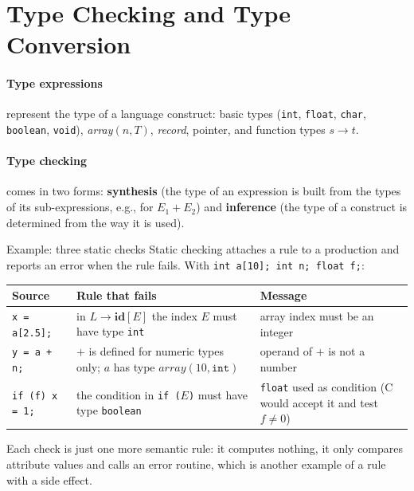 \documentclass[11pt,a4paper]{article}
\begin{document}
\section{Type Checking and Type Conversion}

\paragraph{Type expressions} represent the type of a language construct: basic types (\texttt{int}, \texttt{float}, \texttt{char}, \texttt{boolean}, \texttt{void}), \textit{array}$(n, T)$, \textit{record}, pointer, and function types $s \to t$.

\paragraph{Type checking} comes in two forms: \textbf{synthesis} (the type of an expression is built from the types of its sub-expressions, e.g., for $E_1 + E_2$) and \textbf{inference} (the type of a construct is determined from the way it is used).

\begin{examplebox}{Example: three static checks}
Static checking attaches a rule to a production and reports an error when the rule fails. With \texttt{int a[10]; int n; float f;}:
\begin{center}
\small
\begin{tabular}{@{}l L{5.6cm} L{4.6cm}@{}}
\toprule
\textbf{Source} & \textbf{Rule that fails} & \textbf{Message} \\ \midrule
\texttt{x = a[2.5];} & in $L\to\mathbf{id}[E]$ the index $E$ must have type \texttt{int} & array index must be an integer \\
\texttt{y = a + n;} & $+$ is defined for numeric types only; $a$ has type $\mathit{array}(10,\texttt{int})$ & operand of $+$ is not a number \\
\texttt{if (f) x = 1;} & the condition in \texttt{if (}$E$\texttt{)} must have type \texttt{boolean} & \texttt{float} used as condition (C would accept it and test $f\ne0$) \\ \bottomrule
\end{tabular}
\end{center}
Each check is just one more semantic rule: it computes nothing, it only compares attribute values and calls an error routine, which is another example of a rule with a side effect.
\end{examplebox}
\end{document}

